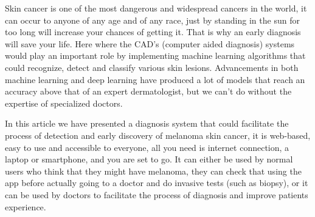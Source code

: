 Skin cancer is one of the most dangerous and widespread cancers in the world, it can occur to anyone of any age and of any race, just by standing in the sun for too long will increase your chances of getting it. That is why an early diagnosis will save your life. Here where the CAD's (computer aided diagnosis) systems would play an important role by implementing machine learning algorithms that could recognize, detect and classify various skin lesions. Advancements in both machine learning and deep learning have produced a lot of models that reach an accuracy above that of an expert dermatologist, but we can't do without the expertise of specialized doctors.

In this article we have presented a diagnosis system that could facilitate the process of detection and early discovery of melanoma skin cancer, it is web-based, easy to use and accessible to everyone, all you need is internet connection, a laptop or smartphone, and you are set to go. It can either be used by normal users who think that they might have melanoma, they can check that using the app before actually going to a doctor and do invasive tests (such as biopsy), or it can be used by doctors to facilitate the process of diagnosis and improve patients experience.





